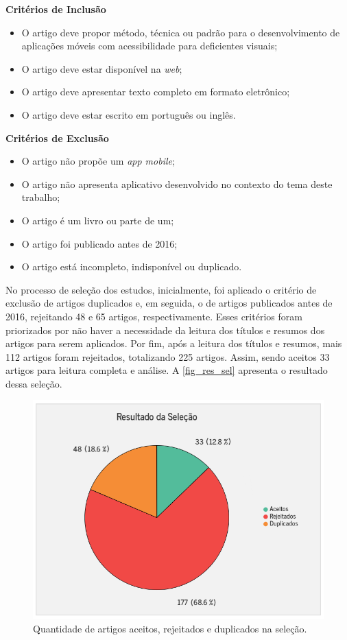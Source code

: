 \textbf{Critérios de Inclusão}
\begin{itemize}
  \item O artigo deve propor método, técnica ou padrão para o desenvolvimento de aplicações móveis com acessibilidade para deficientes visuais;
  \item O artigo deve estar disponível na \emph{web};
  \item O artigo deve apresentar texto completo em formato eletrônico;
  \item O artigo deve estar escrito em português ou inglês.
\end{itemize}

\textbf{Critérios de Exclusão}
\begin{itemize}
  \item O artigo não propõe um \emph{app mobile};
  \item O artigo não apresenta aplicativo desenvolvido no contexto do tema deste trabalho;
  \item O artigo é um livro ou parte de um;
  \item O artigo foi publicado antes de 2016;
  \item O artigo está incompleto, indisponível ou duplicado.
\end{itemize}

No processo de seleção dos estudos, inicialmente, foi aplicado o critério de exclusão de artigos duplicados e, em seguida, o de artigos publicados antes de 2016, rejeitando 48 e 65 artigos, respectivamente. Esses critérios foram priorizados por não haver a necessidade da leitura dos títulos e resumos dos artigos para serem aplicados. Por fim, após a leitura dos títulos e resumos, mais 112 artigos foram rejeitados, totalizando 225 artigos. Assim, sendo aceitos 33 artigos para leitura completa e análise. A \autoref{fig_res_sel} apresenta o resultado dessa seleção.

\begin{figure}[htb]
	\caption{\label{fig_res_sel}Quantidade de artigos aceitos, rejeitados e duplicados na seleção.}
	\begin{center}
	    \includegraphics[scale=0.7]{Imagens/msl/resultado_selecao.png}
	\end{center}
\end{figure}

